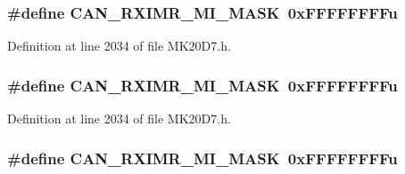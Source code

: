 \subsubsection[{\texorpdfstring{C\+A\+N\+\_\+\+R\+X\+I\+M\+R\+\_\+\+M\+I\+\_\+\+M\+A\+SK}{CAN_RXIMR_MI_MASK}}]{\setlength{\rightskip}{0pt plus 5cm}\#define C\+A\+N\+\_\+\+R\+X\+I\+M\+R\+\_\+\+M\+I\+\_\+\+M\+A\+SK~0x\+F\+F\+F\+F\+F\+F\+F\+Fu}\hypertarget{group___c_a_n___register___masks_ga3cef91282e43c8e5d2c30e65d375f964}{}\label{group___c_a_n___register___masks_ga3cef91282e43c8e5d2c30e65d375f964}


Definition at line 2034 of file M\+K20\+D7.\+h.

\subsubsection[{\texorpdfstring{C\+A\+N\+\_\+\+R\+X\+I\+M\+R\+\_\+\+M\+I\+\_\+\+M\+A\+SK}{CAN_RXIMR_MI_MASK}}]{\setlength{\rightskip}{0pt plus 5cm}\#define C\+A\+N\+\_\+\+R\+X\+I\+M\+R\+\_\+\+M\+I\+\_\+\+M\+A\+SK~0x\+F\+F\+F\+F\+F\+F\+F\+Fu}\hypertarget{group___c_a_n___register___masks_ga3cef91282e43c8e5d2c30e65d375f964}{}\label{group___c_a_n___register___masks_ga3cef91282e43c8e5d2c30e65d375f964}


Definition at line 2034 of file M\+K20\+D7.\+h.

\subsubsection[{\texorpdfstring{C\+A\+N\+\_\+\+R\+X\+I\+M\+R\+\_\+\+M\+I\+\_\+\+M\+A\+SK}{CAN_RXIMR_MI_MASK}}]{\setlength{\rightskip}{0pt plus 5cm}\#define C\+A\+N\+\_\+\+R\+X\+I\+M\+R\+\_\+\+M\+I\+\_\+\+M\+A\+SK~0x\+F\+F\+F\+F\+F\+F\+F\+Fu}\hypertarget{group___c_a_n___register___masks_ga3cef91282e43c8e5d2c30e65d375f964}{}\label{group___c_a_n___register___masks_ga3cef91282e43c8e5d2c30e65d375f964}


